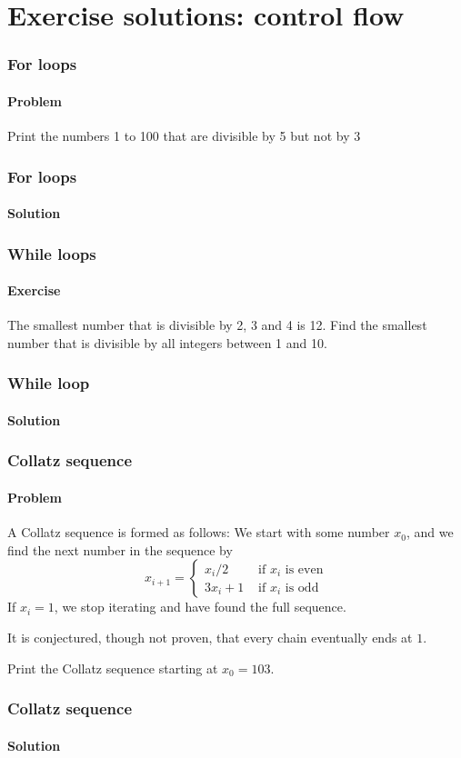 \section{Exercise solutions: control flow} %
\label{sec:exercise_solutions_control_flow}

\begin{frame}\frametitle{For loops}
    \framesubtitle{Problem}

    Print the numbers 1 to 100 that are divisible by 5 but not by 3

\end{frame}

\begin{frame}\frametitle{For loops}
    \framesubtitle{Solution}


\end{frame}

\begin{frame}\frametitle{While loops}
    \framesubtitle{Exercise}

    The smallest number that is divisible by 2, 3 and 4 is 12.
    Find the smallest number that is divisible by all integers between 1 and 10.

\end{frame}

\begin{frame}\frametitle{While loop}
    \framesubtitle{Solution}


\end{frame}


\begin{frame}\frametitle{Collatz sequence}
    \framesubtitle{Problem}

    A Collatz sequence is formed as follows:
    We start with some number $x_0$, and we find the next number in the sequence by
    \[
        x_{i+1} = \begin{cases}
            x_i / 2 & \text{ if $x_i$ is even}\\
            3x_i + 1 & \text{ if $x_i$ is odd}
        \end{cases}
    \]
    If $x_i = 1$, we stop iterating and have found the full sequence.

    It is conjectured, though not proven, that every chain eventually ends at $1$.

    Print the Collatz sequence starting at $x_0 = 103$.

\end{frame}

\begin{frame}\frametitle{Collatz sequence}
    \framesubtitle{Solution}


\end{frame}

